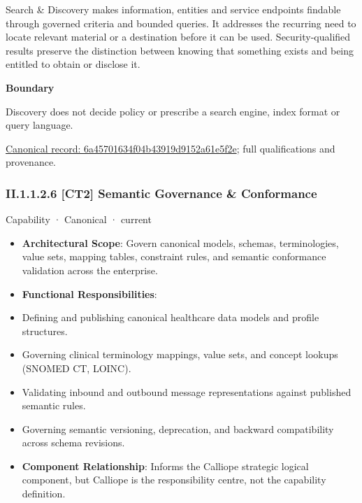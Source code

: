 Search \& Discovery makes information, entities and service endpoints findable through governed criteria and bounded queries. It addresses the recurring need to locate relevant material or a destination before it can be used. Security-qualified results preserve the distinction between knowing that something exists and being entitled to obtain or disclose it.



\textbf{Boundary}



Discovery does not decide policy or prescribe a search engine, index format or query language.


{\footnotesize \href{../../../../../../../continuum/strategy/capability/6a45701634f04b43919d9152a61e5f2e.md}{Canonical record: 6a45701634f04b43919d9152a61e5f2e}; full qualifications and provenance.}\par
\subsubsection*{II.1.1.2.6 [CT2] Semantic Governance \& Conformance}
\label{navigation:II.1.1.2.6}

\label{element:9ee41437bd4c4bd18389f05c12108f97}
{\small Capability · Canonical · current}\par

\begin{itemize}


\item \textbf{Architectural Scope}: Govern canonical models, schemas, terminologies, value sets, mapping tables, constraint rules, and semantic conformance validation across the enterprise.

\item \textbf{Functional Responsibilities}:

\item Defining and publishing canonical healthcare data models and profile structures.

\item Governing clinical terminology mappings, value sets, and concept lookups (SNOMED CT, LOINC).

\item Validating inbound and outbound message representations against published semantic rules.

\item Governing semantic versioning, deprecation, and backward compatibility across schema revisions.

\item \textbf{Component Relationship}: Informs the Calliope strategic logical component, but Calliope is the responsibility centre, not the capability definition.

\end{itemize}



